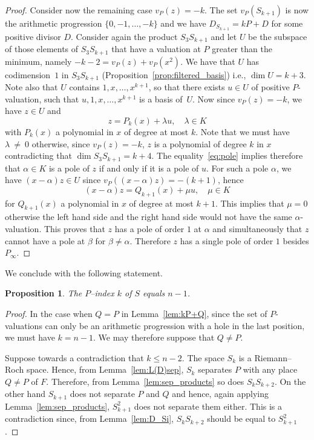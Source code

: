 \documentclass[10pt]{amsart}
\newtheorem{prop}[theo]{Proposition}
\theoremstyle{definition}
\theoremstyle{remark}
\renewcommand{\leq}{\leqslant}
\begin{document}
\begin{proof}
Consider now the remaining case $v_P(z)=-k$. The set $v_P(S_{k+1})$ is now the arithmetic progression $\{0,-1,\ldots, -k\}$ and we have $D_{S_{k+1}}= kP+D$ for some positive divisor $D$. Consider again the product $S_3S_{k+1}$ and let $U$ be the subspace of those elements of $S_3S_{k+1}$ that have a valuation { at $P$} greater than the minimum, namely $-k-2=v_P(z)+v_P(x^2)$. We have that $U$ has codimension~$1$ in $S_3S_{k+1}$ (Proposition~\ref{prop:filtered_basis}) i.e., $\dim U=k+3$. Note also that $U$ contains $1,x,\ldots,x^{k+1}$, so that there exists $u\in U$ of positive $P$-valuation, such that $u,1,x,\ldots,x^{k+1}$ is a basis of~$U$. Now since $v_P(z)=-k$, we have $z\in U$ and
\begin{equation}\label{eq:pole}
z= P_{k}(x)+\lambda u, \quad \lambda\in K
\end{equation}
with $P_{k}(x)$ a polynomial in $x$ of degree at most $k$. Note that we must have $\lambda~\neq~0$ otherwise, since $v_P(z)=-k$, $z$ is a polynomial of degree $k$ in $x$ contradicting that $\dim S_3S_{k+1}=k+4$. The equality~\eqref{eq:pole} implies therefore that $\alpha\in K$ is a pole of $z$ if and only if it is a pole of $u$. For such a pole $\alpha$, we have $(x-\alpha)z\in U$ since $v_P((x-\alpha)z)=-(k+1)$, hence
\[
(x-\alpha)z= Q_{k+1}(x) + \mu u, \quad \mu\in K
\]
for $Q_{k+1}(x)$ a polynomial in $x$ of degree at most $k+1$. This implies that $\mu=0$ otherwise the left hand side and the right hand side would not have the same $\alpha$-valuation. This proves that $z$ has a pole of order $1$ at $\alpha$ and simultaneously that $z$ cannot have a pole at $\beta$ for $\beta\neq \alpha$. Therefore $z$ has a single pole of order $1$ besides $P_\infty$.
\end{proof}

We conclude with the following statement.

\begin{prop}
The $P$--index $k$ of $S$ equals $n-1$.
\end{prop}

\begin{proof}
In the case when $Q=P$ in Lemma~\ref{lem:kP+Q}, since the set of $P$-valuations can only be an arithmetic progression with a hole in the last position, we must have $k=n-1$. We may therefore suppose that $Q\neq P$.

Suppose towards a contradiction that $k\leq n-2$. The space $S_k$ is a Riemann--Roch space. Hence, from Lemma~\ref{lem:L(D)sep}, $S_k$ separates $P$ with any place $Q\neq P$ of $F$. Therefore, from Lemma~\ref{lem:sep_products} so does $S_kS_{k+2}$. On the other hand $S_{k+1}$ does not separate $P$ and $Q$ and hence, again applying Lemma~\ref{lem:sep_products}, $S_{k+1}^2$ does not separate them either. This is a contradiction since, from Lemma~\ref{lem:D_Si}, $S_{k}S_{k+2}$ should be equal to $S_{k+1}^2$.
\end{proof}
\end{document}
